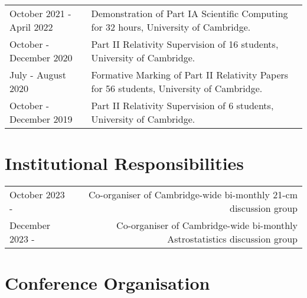 \documentclass{article}
\begin{document}
\begin{tabular}{>{\raggedleft}p{}!{\vrule}p{0.76\textwidth}}
	October 2021 - April 2022 & Demonstration of Part IA Scientific Computing for 32 hours, University of Cambridge.\\
	October - December 2020 & Part II Relativity Supervision of 16 students,  University of Cambridge. \\
	July - August 2020 & Formative Marking of Part II Relativity Papers for 56 students, University of Cambridge. \\
	October - December 2019 & Part II Relativity Supervision of 6 students, University of Cambridge.
\end{tabular}

\section*{Institutional Responsibilities}

\begin{tabular}{L!{\vrule}R}
    October 2023 - & Co-organiser of Cambridge-wide bi-monthly 21-cm discussion group \\
    December 2023 - & Co-organiser of Cambridge-wide bi-monthly Astrostatistics discussion group \\
\end{tabular}

\section*{Conference Organisation}
\end{document}
